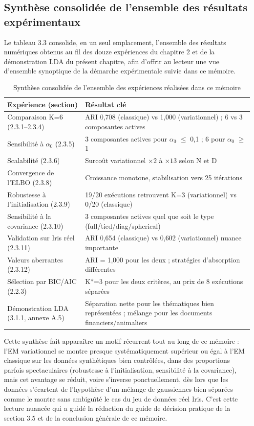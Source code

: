 \subsection{Synthèse consolidée de l'ensemble des résultats expérimentaux}
Le tableau 3.3 consolide, en un seul emplacement, l'ensemble des résultats numériques obtenus au fil des douze expériences du chapitre 2 et de la démonstration LDA du présent chapitre, afin d'offrir au lecteur une vue d'ensemble synoptique de la démarche expérimentale suivie dans ce mémoire.

\begin{table}[H]
\centering
\small
\setlength{\tabcolsep}{0.14cm}
\begin{tabular}{|p{7.42cm}|p{7.42cm}|}
\hline
\textbf{Expérience (section)} & \textbf{Résultat clé} \\
\hline
Comparaison K=6 (2.3.1--2.3.4) & ARI 0,708 (classique) vs 1,000 (variationnel) ; 6 vs 3 composantes actives \\
\hline
Sensibilité à $\alpha _{0}$ (2.3.5) & 3 composantes actives pour $\alpha _{0}$ $\leq $ 0,1 ; 6 pour $\alpha _{0}$ $\geq $ 1 \\
\hline
Scalabilité (2.3.6) & Surcoût variationnel $\times 2$ à $\times 13$ selon N et D \\
\hline
Convergence de l'ELBO (2.3.8) & Croissance monotone, stabilisation vers 25 itérations \\
\hline
Robustesse à l'initialisation (2.3.9) & 19/20 exécutions retrouvent K=3 (variationnel) vs 0/20 (classique) \\
\hline
Sensibilité à la covariance (2.3.10) & 3 composantes actives quel que soit le type (full/tied/diag/spherical) \\
\hline
Validation sur Iris réel (2.3.11) & ARI 0,654 (classique) vs 0,602 (variationnel)  nuance importante \\
\hline
Valeurs aberrantes (2.3.12) & ARI = 1,000 pour les deux ; stratégies d'absorption différentes \\
\hline
Sélection par BIC/AIC (2.2.3) & K*=3 pour les deux critères, au prix de 8 exécutions séparées \\
\hline
Démonstration LDA (3.1.1, annexe A.5) & Séparation nette pour les thématiques bien représentées ; mélange pour les documents financiers/animaliers \\
\hline
\end{tabular}
\caption{Synthèse consolidée de l'ensemble des expériences réalisées dans ce mémoire}
\label{tab:3_3}
\end{table}
Cette synthèse fait apparaître un motif récurrent tout au long de ce mémoire : l'EM variationnel se montre presque systématiquement supérieur ou égal à l'EM classique sur les données synthétiques bien contrôlées, dans des proportions parfois spectaculaires (robustesse à l'initialisation, sensibilité à la covariance), mais cet avantage se réduit, voire s'inverse ponctuellement, dès lors que les données s'écartent de l'hypothèse d'un mélange de gaussiennes bien séparées  comme le montre sans ambiguïté le cas du jeu de données réel Iris. C'est cette lecture nuancée qui a guidé la rédaction du guide de décision pratique de la section 3.5 et de la conclusion générale de ce mémoire.


